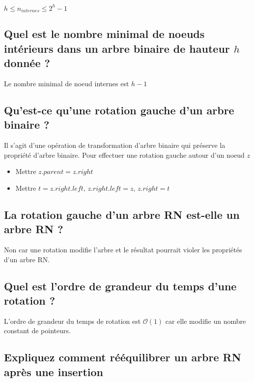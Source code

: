 \documentclass[11pt]{article}
\begin{document}
$h \leq n_{internes} \leq 2^h - 1$ 

\subsection{Quel est le nombre minimal de noeuds intérieurs dans un arbre binaire de hauteur $h$ donnée ?}

Le nombre minimal de noeud internes est $h - 1$

\subsection{Qu'est-ce qu'une rotation gauche d'un arbre binaire ?}

Il s'agit d'une opération de transformation d'arbre binaire qui préserve la propriété d'arbre binaire.
Pour effectuer une rotation gauche autour d'un noeud $z$

\begin{itemize}
	\item Mettre $z.parent = z.right$
	\item Mettre $t = z.right.left$, $z.right.left = z$, $z.right = t$
\end{itemize} 

\subsection{La rotation gauche d'un arbre RN est-elle un arbre RN ?}

Non car une rotation modifie l'arbre et le résultat pourrait violer les propriétés d'un arbre RN. 

\subsection{Quel est l'ordre de grandeur du temps d'une rotation ?}

L'ordre de grandeur du temps de rotation est $\mathcal{O}(1)$ car elle modifie un nombre constant de pointeurs.

\subsection{Expliquez comment rééquilibrer un arbre RN après une insertion}
\end{document}
